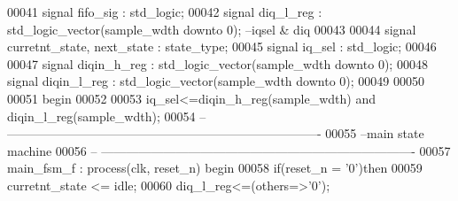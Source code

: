 \begin{DoxyCode}
00041 \textcolor{keywordflow}{signal} \textcolor{vhdlchar}{fifo_sig} \textcolor{vhdlchar}{:} \textcolor{comment}{std\_logic};
00042 \textcolor{keywordflow}{signal} \textcolor{vhdlchar}{diq_l_reg}    \textcolor{vhdlchar}{:} \textcolor{comment}{std\_logic\_vector}\textcolor{vhdlchar}{(}\textcolor{vhdlchar}{sample_wdth} \textcolor{keywordflow}{downto} \textcolor{vhdllogic}{}\textcolor{vhdllogic}{0}\textcolor{vhdlchar}{)};\textcolor{keyword}{    --iqsel & diq}
00043 
00044 \textcolor{keywordflow}{signal} \textcolor{vhdlchar}{curretnt_state}\textcolor{vhdlchar}{,} \textcolor{vhdlchar}{next_state} \textcolor{vhdlchar}{:} \textcolor{vhdlchar}{state_type};
00045 \textcolor{keywordflow}{signal} \textcolor{vhdlchar}{iq_sel}           \textcolor{vhdlchar}{:}  \textcolor{comment}{std\_logic};
00046 
00047 \textcolor{keywordflow}{signal} \textcolor{vhdlchar}{diqin_h_reg}      \textcolor{vhdlchar}{:} \textcolor{comment}{std\_logic\_vector}\textcolor{vhdlchar}{(}\textcolor{vhdlchar}{sample_wdth} \textcolor{keywordflow}{downto} \textcolor{vhdllogic}{}\textcolor{vhdllogic}{0}\textcolor{vhdlchar}{)};
00048 \textcolor{keywordflow}{signal} \textcolor{vhdlchar}{diqin_l_reg}      \textcolor{vhdlchar}{:} \textcolor{comment}{std\_logic\_vector}\textcolor{vhdlchar}{(}\textcolor{vhdlchar}{sample_wdth} \textcolor{keywordflow}{downto} \textcolor{vhdllogic}{}\textcolor{vhdllogic}{0}\textcolor{vhdlchar}{)};
00049 
00050   
00051 \textcolor{vhdlkeyword}{begin}
00052   
00053     \textcolor{vhdlchar}{iq_sel}\textcolor{vhdlchar}{<=}\textcolor{vhdlchar}{diqin_h_reg}\textcolor{vhdlchar}{(}\textcolor{vhdlchar}{sample_wdth}\textcolor{vhdlchar}{)} \textcolor{keywordflow}{and} \textcolor{vhdlchar}{diqin_l_reg}\textcolor{vhdlchar}{(}\textcolor{vhdlchar}{sample_wdth}\textcolor{vhdlchar}{)}; 
00054 \textcolor{keyword}{-- ----------------------------------------------------------------------------}
00055 \textcolor{keyword}{--main state machine}
00056 \textcolor{keyword}{-- ----------------------------------------------------------------------------}
00057 main\_fsm\_f : \textcolor{keywordflow}{process}(clk, reset_n) \textcolor{keywordflow}{begin}
00058     \textcolor{keywordflow}{if}\textcolor{vhdlchar}{(}\textcolor{vhdlchar}{reset_n} \textcolor{vhdlchar}{=} \textcolor{vhdlchar}{'}\textcolor{vhdllogic}{}\textcolor{vhdllogic}{0}\textcolor{vhdlchar}{'}\textcolor{vhdlchar}{)}\textcolor{keywordflow}{then}
00059         \textcolor{vhdlchar}{curretnt_state} \textcolor{vhdlchar}{<=} \textcolor{vhdlchar}{idle};
00060         \textcolor{vhdlchar}{diq_l_reg}\textcolor{vhdlchar}{<=}\textcolor{vhdlchar}{(}\textcolor{keywordflow}{others}\textcolor{vhdlchar}{=}\textcolor{vhdlchar}{>}\textcolor{vhdlchar}{'}\textcolor{vhdllogic}{}\textcolor{vhdllogic}{0}\textcolor{vhdlchar}{'}\textcolor{vhdlchar}{)};

\end{DoxyCode}
